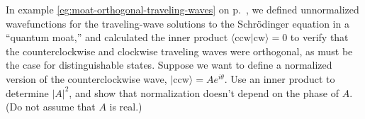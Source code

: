 In example \ref{eg:moat-orthogonal-traveling-waves} on p.~\pageref{eg:moat-orthogonal-traveling-waves},
we defined unnormalized wavefunctions for the traveling-wave solutions to the Schr\"odinger equation
in a ``quantum moat,'' and calculated the inner product
$\langle \text{ccw} | \text{cw} \rangle=0$ to verify that the counterclockwise and clockwise
traveling waves were orthogonal, as must be the case for distinguishable states.
Suppose we want to define a normalized version of the counterclockwise wave,
$|\text{ccw}\rangle=Ae^{i\theta}$. Use an inner product to determine $|A|^2$, and show that
normalization doesn't depend on the phase of $A$. (Do not assume that $A$ is real.)

